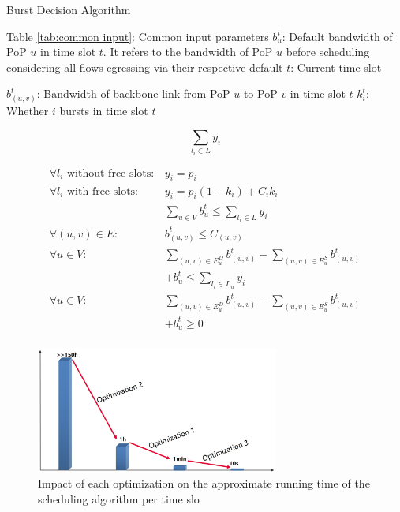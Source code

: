 \begin{algorithm}
	\caption{{\EGRESS} Burst Decision Algorithm}
	\label{alg4}
	\begin{algorithmic}
		\renewcommand{\algorithmicrequire}{ \textbf{Inputs:}}
		\REQUIRE 
		\STATE Table \ref{tab:common input}: Common input parameters
        \STATE $b^t_u$: Default bandwidth of PoP $u$ in time slot $t$. It refers to the bandwidth of PoP $u$ before scheduling considering all flows egressing via their respective default {\egress}
        \STATE $t$: Current time slot
            
		
		\renewcommand{\algorithmicensure}{ \textbf{Outputs:}}
		\ENSURE 
            
            \STATE $b^t_{(u,v)}$: Bandwidth of backbone link from PoP $u$ to PoP $v$ in time slot $t$
            \STATE $k_{i}^t$: Whether {\egress} $i$ bursts in time slot $t$
		
		\renewcommand{\algorithmicensure}{ \textbf{Minimize:}}
		\ENSURE
		$$\sum_{l_i \in L} y_i $$

		\renewcommand{\algorithmicensure}{ \textbf{Subject to:}}
		\ENSURE
            $$\begin{array}{ll}
             \forall l_i \text{ without free slots} : & y_i=p_i\\
             \forall l_i \text{ with free slots} :&y_i=p_i(1-k_i)+C_ik_i\\
            & \sum_{u\in V} b_u^t\le \sum_{l_i \in L} y_i \\
             \forall(u,v) \in E :&b_{(u,v)}^t \le C_{(u,v)}\\
             \forall u \in V : & \sum_{(u,v)\in E_u^D} b_{(u,v)}^t - \sum_{(u,v)\in E_u^S} b_{(u,v)}^t\\& + b_u^t\le \sum_{l_i\in L_u} y_i\\
             \forall u \in V :& \sum_{(u,v)\in E_u^D} b_{(u,v)}^t - \sum_{(u,v)\in E_u^S} b_{(u,v)}^t\\ & + b_u^t \ge 0\\
            
            \end{array}$$
	\end{algorithmic}
\end{algorithm}


\begin{figure}
	\centering
	\includegraphics[width = 8cm]{figs/implement/OptEffect.jpg}
	\caption{\small Impact of each optimization on the
 approximate running time of the scheduling algorithm per time slo}
	\label{fig:OptEffect}
\end{figure} 